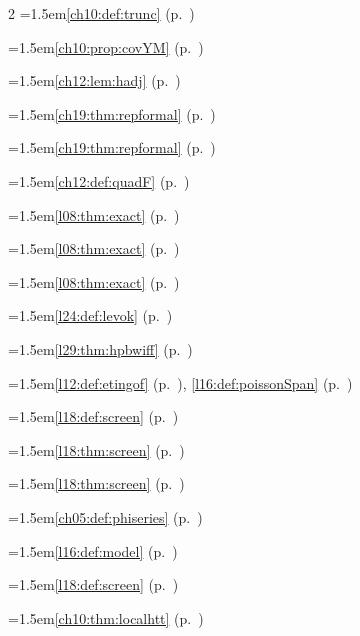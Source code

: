 \begin{multicols}{2}
\hangindent=1.5em\quad \ref{ch10:def:trunc} (p.~\pageref{ch10:def:trunc})\par
\hangindent=1.5em\quad \ref{ch10:prop:covYM} (p.~\pageref{ch10:prop:covYM})\par
\hangindent=1.5em\quad \ref{ch12:lem:hadj} (p.~\pageref{ch12:lem:hadj})\par
\hangindent=1.5em\quad \ref{ch19:thm:repformal} (p.~\pageref{ch19:thm:repformal})\par
\hangindent=1.5em\quad \ref{ch19:thm:repformal} (p.~\pageref{ch19:thm:repformal})\par
\hangindent=1.5em\quad \ref{ch12:def:quadF} (p.~\pageref{ch12:def:quadF})\par
\hangindent=1.5em\quad \ref{l08:thm:exact} (p.~\pageref{l08:thm:exact})\par
\hangindent=1.5em\quad \ref{l08:thm:exact} (p.~\pageref{l08:thm:exact})\par
\hangindent=1.5em\quad \ref{l08:thm:exact} (p.~\pageref{l08:thm:exact})\par
\hangindent=1.5em\quad \ref{l24:def:levok} (p.~\pageref{l24:def:levok})\par
\hangindent=1.5em\quad \ref{l29:thm:hpbwiff} (p.~\pageref{l29:thm:hpbwiff})\par
\hangindent=1.5em\quad \ref{l12:def:etingof} (p.~\pageref{l12:def:etingof}), \ref{l16:def:poissonSpan} (p.~\pageref{l16:def:poissonSpan})\par
\hangindent=1.5em\quad \ref{l18:def:screen} (p.~\pageref{l18:def:screen})\par
\hangindent=1.5em\quad \ref{l18:thm:screen} (p.~\pageref{l18:thm:screen})\par
\hangindent=1.5em\quad \ref{l18:thm:screen} (p.~\pageref{l18:thm:screen})\par
\hangindent=1.5em\quad \ref{ch05:def:phiseries} (p.~\pageref{ch05:def:phiseries})\par
\hangindent=1.5em\quad \ref{l16:def:model} (p.~\pageref{l16:def:model})\par
\hangindent=1.5em\quad \ref{l18:def:screen} (p.~\pageref{l18:def:screen})\par
\hangindent=1.5em\quad \ref{ch10:thm:localhtt} (p.~\pageref{ch10:thm:localhtt})\par

\end{multicols}
